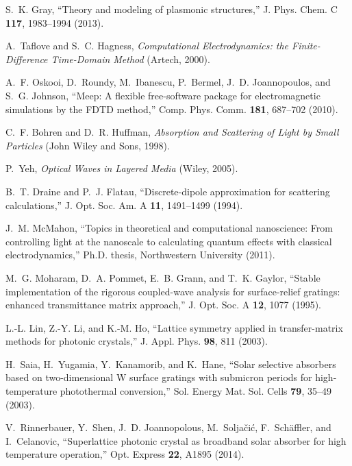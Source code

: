 \documentclass[10pt,letterpaper]{article}
\begin{document}
\begin{thebibliography}{100}
S.~K. Gray, \enquote{Theory and modeling of plasmonic structures,} J. Phys.
  Chem. C \textbf{117}, 1983--1994 (2013).

A.~Taflove and S.~C. Hagness, \emph{Computational Electrodynamics: the
  Finite-Difference Time-Domain Method} (Artech, 2000).

A.~F. Oskooi, D.~Roundy, M.~Ibanescu, P.~Bermel, J.~D. Joannopoulos, and S.~G.
  Johnson, \enquote{Meep: A flexible free-software package for electromagnetic
  simulations by the {FDTD} method,} Comp. Phys. Comm. \textbf{181}, 687–702
  (2010).

C.~F. Bohren and D.~R. Huffman, \emph{Absorption and Scattering of Light by
  Small Particles} (John Wiley and Sons, 1998).

P.~Yeh, \emph{Optical Waves in Layered Media} (Wiley, 2005).

B.~T. Draine and P.~J. Flatau, \enquote{Discrete-dipole approximation for
  scattering calculations,} J. Opt. Soc. Am. A \textbf{11}, 1491--1499 (1994).

J.~M. McMahon, \enquote{Topics in theoretical and computational nanoscience:
  From controlling light at the nanoscale to calculating quantum effects with
  classical electrodynamics,} Ph.D. thesis, Northwestern University (2011).

M.~G. Moharam, D.~A. Pommet, E.~B. Grann, and T.~K. Gaylor, \enquote{Stable
  implementation of the rigorous coupled-wave analysis for surface-relief
  gratings: enhanced transmittance matrix approach,} J. Opt. Soc. A
  \textbf{12}, 1077 (1995).

L.-L. Lin, Z.-Y. Li, and K.-M. Ho, \enquote{Lattice symmetry applied in
  transfer-matrix methods for photonic crystals,} J. Appl. Phys. \textbf{98},
  811 (2003).

H.~Saia, H.~Yugamia, Y.~Kanamorib, and K.~Hane, \enquote{Solar selective
  absorbers based on two-dimensional {W} surface gratings with submicron
  periods for high-temperature photothermal conversion,} Sol. Energy Mat. Sol.
  Cells \textbf{79}, 35--49 (2003).

V.~Rinnerbauer, Y.~Shen, J.~D. Joannopolous, M.~Solja{\v c}i{\' c}, F.~Sch{\"
  a}ffler, and I.~Celanovic, \enquote{Superlattice photonic crystal as
  broadband solar absorber for high temperature operation,} Opt. Express
  \textbf{22}, A1895 (2014).


\end{thebibliography}
\end{document}
